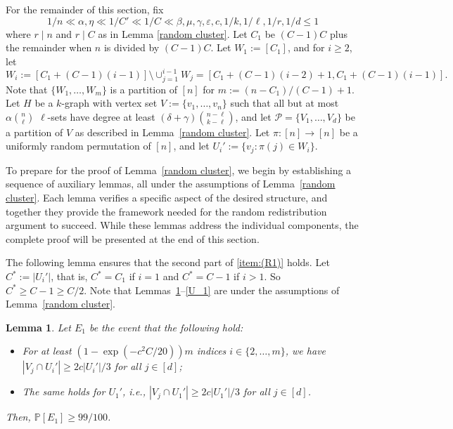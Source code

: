 \documentclass[11pt, letterpaper]{amsart}
\theoremstyle{plain}
\numberwithin{equation}{section}
\newtheorem{lemma}[thm]{Lemma}
\theoremstyle{definition}
\newcommand\card[1]{\left| #1 \right|}
\begin{document}
For the remainder of this section, fix 
\[
1/n\ll \alpha,\eta\ll1/C'\ll 1/C\ll \beta,\mu,\gamma,\varepsilon,c,1/k,1/\ell,1/r,1/d\le 1
\]
where $r\mid n$ and $r\mid C$ as in Lemma \ref{random cluster}. 
Let $C_1$ be $(C-1)C$ plus the remainder when $n$ is divided by $(C-1)C$. Let $W_1:=[C_1]$, and for $i\ge2$, let $W_i:=[C_1+(C-1)(i-1)]\setminus{\cup_{j=1}^{i-1}W_j}=[C_1+(C-1)(i-2)+1,C_1+(C-1)(i-1)].$ 
Note that $\{W_1,\dots,W_m\}$ is a partition of $[n]$ for $m:=(n-C_1)/(C-1)+1$. 
Let $H$ be a $k$-graph with vertex set $V:=\{v_1,\dots,v_n\}$ such that all but at most $\alpha \binom{n}{\ell}$ $\ell$-sets have degree at least $(\delta+\gamma)\binom{n-\ell}{k-\ell}$, and let $\mathcal{P}=\{V_1,\dots,V_d\}$ be a partition of $V$ as described in Lemma~\ref{random cluster}. 
    Let $\pi:[n]\rightarrow[n]$ be a uniformly random permutation of $[n]$, and let $U_i':=\{v_j:\pi(j)\in W_i\}.$ 
    
    To prepare for the proof of Lemma~\ref{random cluster}, we begin by establishing a sequence of auxiliary lemmas, all under the assumptions of Lemma~\ref{random cluster}. 
    Each lemma verifies a specific aspect of the desired structure, and together they provide the framework needed for the random redistribution argument to succeed. 
    While these lemmas address the individual components, the complete proof will be presented at the end of this section.

The following lemma ensures that the second part of \ref{item:(R1)} holds.
Let $ C^*:=|U_i'|$, that is, $C^*=C_1$ if $i=1$ and $C^*=C-1$ if $i>1$.
So $C^*\ge C-1\ge C/2$. 
Note that Lemmas~\ref{size of random cluster}--\ref{U_1} are under the assumptions of Lemma~\ref{random cluster}.
    
\begin{lemma}\label{size of random cluster}
Let $E_1$ be the event that the following hold: 
\begin{itemize}
\item For at least  $\left(1-\exp{(-c^2C/20)}\right)m$ indices $i\in\{2,\dots,m\}$, we have $|V_j\cap U_i'|\ge 2c\card{U_i'}/3$ for all \(j\in [d]\);
\item The same holds for \(U_1'\), i.e., $|V_j\cap U_1'|\ge 2c\card{U_1'}/3$ for all \(j\in [d]\).
\end{itemize} 
Then, $\mathbb{P}\left[E_1\right]\ge 99/100$.
    \end{lemma}
\end{document}
